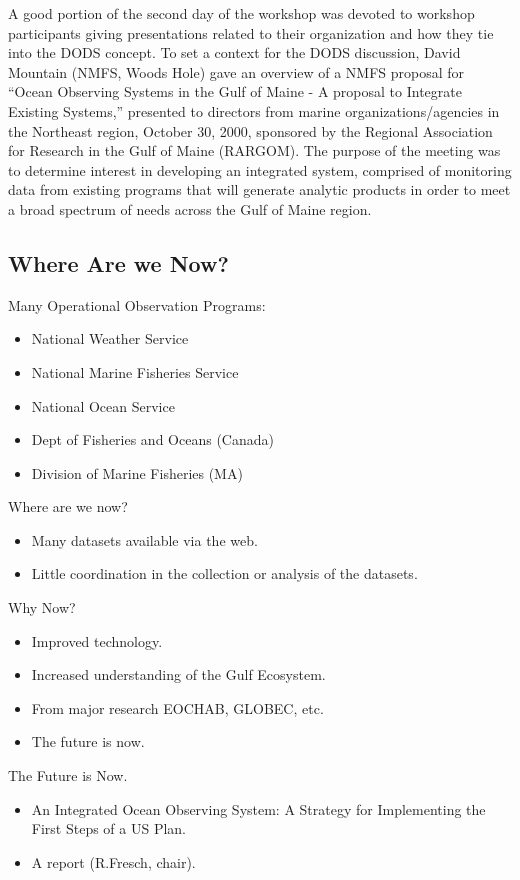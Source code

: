 A good portion of the second day of the workshop was devoted to
workshop participants giving presentations related to their
organization and how they tie into the DODS concept. To set a context
for the DODS discussion, David Mountain (NMFS, Woods Hole) gave an
overview of a NMFS proposal for ``Ocean Observing Systems in the Gulf
of Maine - A proposal to Integrate Existing Systems,'' presented to
directors from marine organizations/agencies in the Northeast region,
October 30, 2000, sponsored by the Regional Association for Research
in the Gulf of Maine (RARGOM). The purpose of the meeting was to
determine interest in developing an integrated system, comprised of
monitoring data from existing programs that will generate analytic
products in order to meet a broad spectrum of needs across the Gulf of
Maine region.

\subsection{Where Are we Now?}

Many Operational Observation Programs:
\begin{itemize}
\item National Weather Service
\item National Marine Fisheries Service
\item National Ocean Service
\item Dept of Fisheries and Oceans (Canada)
\item Division of Marine Fisheries (MA)
\end{itemize}

Where are we now?
\begin{itemize}
\item Many datasets available via the web.
\item Little coordination in the collection or analysis of the datasets.
\end{itemize}

Why Now?
\begin{itemize}
\item Improved technology.
\item Increased understanding of the Gulf Ecosystem.
\item From major research EOCHAB, GLOBEC, etc.
\item The future is now.
\end{itemize}

The Future is Now.
\begin{itemize}
\item An Integrated Ocean Observing System: A Strategy for
  Implementing the First Steps of a US Plan.
\item A report (R.Fresch, chair).
\end{itemize}

